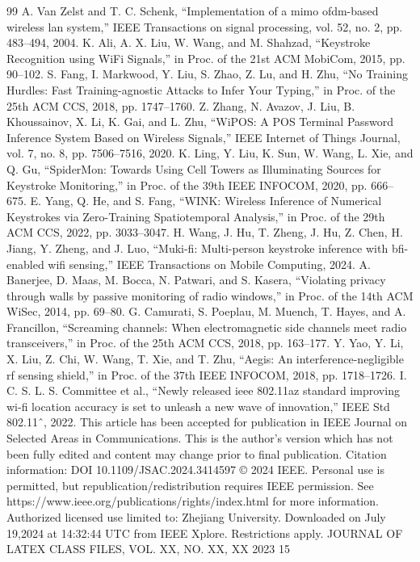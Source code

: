 \documentclass[journal]{IEEEtran}
\begin{document}
\begin{thebibliography}{99}
 A. Van Zelst and T. C. Schenk, “Implementation of a mimo ofdm-based wireless lan system,” IEEE Transactions on signal processing, vol. 52, no. 2, pp. 483–494, 2004.
 K. Ali, A. X. Liu, W. Wang, and M. Shahzad, “Keystroke Recognition using WiFi Signals,” in Proc. of the 21st ACM MobiCom, 2015, pp. 90–102.
 S. Fang, I. Markwood, Y. Liu, S. Zhao, Z. Lu, and H. Zhu, “No Training Hurdles: Fast Training-agnostic Attacks to Infer Your Typing,” in Proc. of the 25th ACM CCS, 2018, pp. 1747–1760.
 Z. Zhang, N. Avazov, J. Liu, B. Khoussainov, X. Li, K. Gai, and L. Zhu, “WiPOS: A POS Terminal Password Inference System Based on Wireless Signals,” IEEE Internet of Things Journal, vol. 7, no. 8, pp. 7506–7516, 2020.
 K. Ling, Y. Liu, K. Sun, W. Wang, L. Xie, and Q. Gu, “SpiderMon: Towards Using Cell Towers as Illuminating Sources for Keystroke Monitoring,” in Proc. of the 39th IEEE INFOCOM, 2020, pp. 666–675.
 E. Yang, Q. He, and S. Fang, “WINK: Wireless Inference of Numerical Keystrokes via Zero-Training Spatiotemporal Analysis,” in Proc. of the 29th ACM CCS, 2022, pp. 3033–3047.
 H. Wang, J. Hu, T. Zheng, J. Hu, Z. Chen, H. Jiang, Y. Zheng, and J. Luo, “Muki-fi: Multi-person keystroke inference with bfi-enabled wifi sensing,” IEEE Transactions on Mobile Computing, 2024.
 A. Banerjee, D. Maas, M. Bocca, N. Patwari, and S. Kasera, “Violating privacy through walls by passive monitoring of radio windows,” in Proc. of the 14th ACM WiSec, 2014, pp. 69–80.
 G. Camurati, S. Poeplau, M. Muench, T. Hayes, and A. Francillon, “Screaming channels: When electromagnetic side channels meet radio transceivers,” in Proc. of the 25th ACM CCS, 2018, pp. 163–177.
 Y. Yao, Y. Li, X. Liu, Z. Chi, W. Wang, T. Xie, and T. Zhu, “Aegis: An interference-negligible rf sensing shield,” in Proc. of the 37th IEEE INFOCOM, 2018, pp. 1718–1726.
 I. C. S. L. S. Committee et al., “Newly released ieee 802.11az standard improving wi-fi location accuracy is set to unleash a new wave of innovation,” IEEE Std 802.11ˆ, 2022. This article has been accepted for publication in IEEE Journal on Selected Areas in Communications. This is the author's version which has not been fully edited and content may change prior to final publication. Citation information: DOI 10.1109/JSAC.2024.3414597 © 2024 IEEE. Personal use is permitted, but republication/redistribution requires IEEE permission. See https://www.ieee.org/publications/rights/index.html for more information. Authorized licensed use limited to: Zhejiang University. Downloaded on July 19,2024 at 14:32:44 UTC from IEEE Xplore. Restrictions apply. JOURNAL OF LATEX CLASS FILES, VOL. XX, NO. XX, XX 2023 15

\end{thebibliography}
\end{document}
